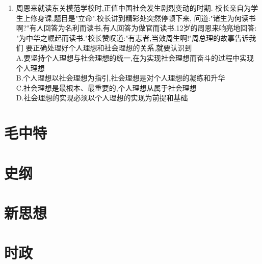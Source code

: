 \documentclass[12pt, a4paper, oneside, UTF8]{ctexbook}
\begin{document}
\begin{enumerate}
    \item 周恩来就读东关模范学校时,正值中国社会发生剧烈变动的时期.
    校长亲自为学生上修身课,题目是"立命".校长讲到精彩处突然停顿下来,
    问道:"诸生为何读书啊?"有人回答为名利而读书,有人回答为做官而读书.12岁的周恩来响亮地回答:
    "为中华之崛起而读书."校长赞叹道:"有志者,当效周生啊!"周总理的故事告诉我们
    要正确处理好个人理想和社会理想的关系,就要认识到 \\
    A.要坚持个人理想与社会理想的统一,在为实现社会理想而奋斗的过程中实现个人理想 \\
    B.个人理想以社会理想为指引,社会理想是对个人理想的凝练和升华 \\
    C.社会理想是最根本、最重要的,个人理想从属于社会理想 \\
    D.社会理想的实现必须以个人理想的实现为前提和基础 
\end{enumerate}
\section{毛中特} 

\section{史纲}

\section{新思想}

\section{时政}

\ifx\allfiles\undefined
\end{document}
